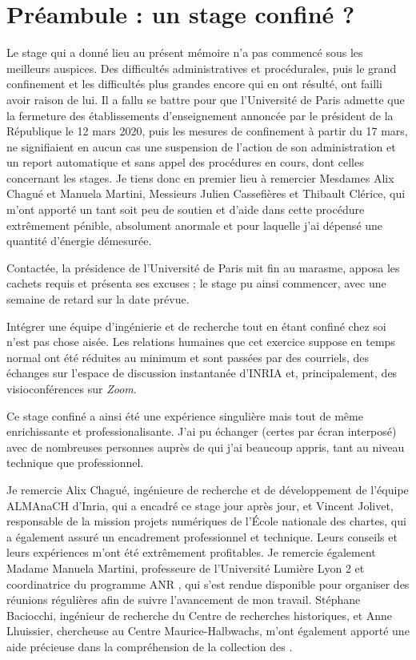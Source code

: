 \section*{Préambule : un stage confiné ?}

Le stage qui a donné lieu au présent mémoire n'a pas commencé sous les meilleurs auspices. Des difficultés administratives et procédurales, puis le grand confinement et les difficultés plus grandes encore qui en ont résulté, ont failli avoir raison de lui. Il a fallu se battre pour que l'Université de Paris admette que la fermeture des établissements d'enseignement annoncée par le président de la République le 12 mars 2020, puis les mesures de confinement à partir du 17 mars, ne signifiaient en aucun cas une suspension de l'action de son administration et un report automatique et sans appel des procédures en cours, dont celles concernant les stages. Je tiens donc en premier lieu à remercier Mesdames Alix Chagué et Manuela Martini, Messieurs Julien Cassefières et Thibault Clérice, qui m'ont apporté un tant soit peu de soutien et d'aide dans cette procédure extrêmement pénible, absolument anormale et pour laquelle j'ai dépensé une quantité d'énergie démesurée.

Contactée, la présidence de l'Université de Paris mit fin au marasme, apposa les cachets requis et présenta ses excuses ; le stage pu ainsi commencer, avec une semaine de retard sur la date prévue.

Intégrer une équipe d'ingénierie et de recherche tout en étant confiné chez soi n'est pas chose aisée. Les relations humaines que cet exercice suppose en temps normal ont été réduites au minimum et sont passées par des courriels, des échanges sur l'espace de discussion instantanée d'INRIA et, principalement, des visioconférences sur \textit{Zoom}.

Ce stage confiné a ainsi été une expérience singulière mais tout de même enrichissante et professionalisante. J'ai pu échanger (certes par écran interposé) avec de nombreuses personnes auprès de qui j'ai beaucoup appris, tant au niveau technique que professionnel.

Je remercie Alix Chagué, ingénieure de recherche et de développement de l'équipe ALMAnaCH d'Inria, qui a encadré ce stage jour après jour, et Vincent Jolivet, responsable de la mission projets numériques de l'École nationale des chartes, qui a également assuré un encadrement professionnel et technique. Leurs conseils et leurs expériences m'ont été extrêmement profitables. Je remercie également Madame Manuela Martini, professeure de l'Université Lumière Lyon 2 et coordinatrice du programme ANR \timeus{}, qui s'est rendue disponible pour organiser des réunions régulières afin de suivre l'avancement de mon travail. Stéphane Baciocchi, ingénieur de recherche du Centre de recherches historiques, et Anne Lhuissier, chercheuse au Centre Maurice-Halbwachs, m'ont également apporté une aide précieuse dans la compréhension de la collection des \odm.

